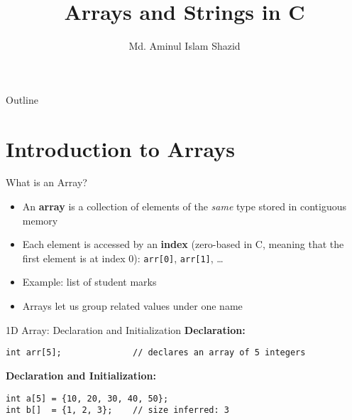 \documentclass[12pt, aspectratio=169]{beamer}
\title{Arrays and Strings in C}
\author{Md. Aminul Islam Shazid}
\date{}
\begin{document}
    {
		\addtocounter{framenumber}{-2}    %

		\begin{frame}
			\titlepage
		\end{frame}

		\begin{frame}{Outline}
            \vfill
			\tableofcontents[subsectionstyle=hide]
            \vfill
		\end{frame}
	}


\section{Introduction to Arrays}


    \begin{frame}{What is an Array?}
        \begin{itemize}
            \item An \textbf{array} is a collection of elements of the \emph{same} type stored in contiguous memory
            \item Each element is accessed by an \textbf{index} (zero-based in C, meaning that the first element is at index 0): \texttt{arr[0]}, \texttt{arr[1]}, \dots
            \item Example: list of student marks
            \item Arrays let us group related values under one name
        \end{itemize}
    \end{frame}

    \begin{frame}[fragile]{1D Array: Declaration and Initialization}
        \textbf{Declaration:}
        \begin{verbatim}
int arr[5];              // declares an array of 5 integers
        \end{verbatim}

        \textbf{Declaration and Initialization:}
        \begin{verbatim}
int a[5] = {10, 20, 30, 40, 50};
int b[]  = {1, 2, 3};    // size inferred: 3
        \end{verbatim}
    \end{frame}

\end{document}

